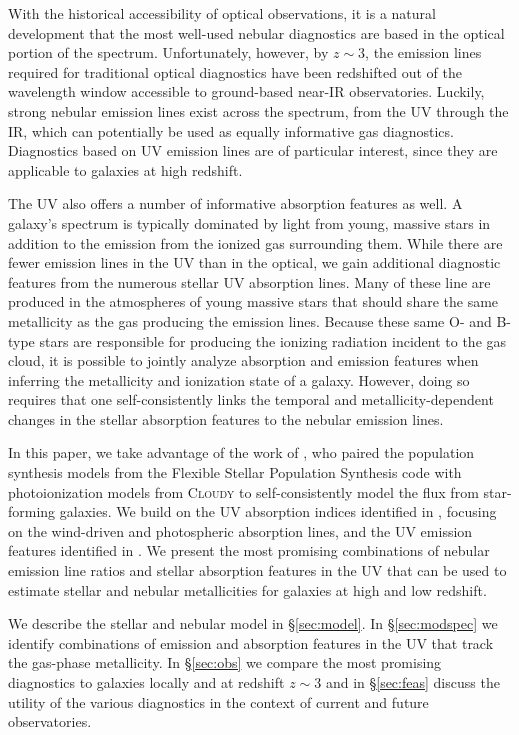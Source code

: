 \documentclass[preprint2,trackchanges]{aastex62}
\newcommand{\z}[1]{$z \sim {#1}$}
\newcommand{\FSPS}{{\sc FSPS}\xspace}
\newcommand{\Cloudy}{\textsc{Cloudy}\xspace}
\begin{document}
With the historical accessibility of optical observations, it is a natural development that the most well-used nebular diagnostics are based in the optical portion of the spectrum. Unfortunately, however, by \z{3}, the emission lines required for traditional optical diagnostics have been redshifted out of the wavelength window accessible to ground-based near-IR observatories. Luckily, strong nebular emission lines exist across the spectrum, from the UV through the IR, which can potentially be used as equally informative gas diagnostics. Diagnostics based on UV emission lines are of particular interest, since they are applicable to galaxies at high redshift.

The UV also offers a number of informative absorption features as well. A galaxy's spectrum is typically dominated by light from young, massive stars in addition to the emission from the ionized gas surrounding them. While there are fewer emission lines in the UV than in the optical, we gain additional diagnostic features from the numerous stellar UV absorption lines. Many of these line are produced in the atmospheres of young massive stars that should share the same metallicity as the gas producing the emission lines. Because these same O- and B-type stars are responsible for producing the ionizing radiation incident to the gas cloud, it is possible to jointly analyze absorption and emission features when inferring the metallicity and ionization state of a galaxy. However, doing so requires that one self-consistently links the temporal and metallicity-dependent changes in the stellar absorption features to the nebular emission lines.

In this paper, we take advantage of the work of \citet{Byler+2017}, who paired the population synthesis models from the Flexible Stellar Population Synthesis code \citep[\FSPS; ][]{Conroy+2009, Conroy+2010} with photoionization models from \Cloudy to self-consistently model the flux from star-forming galaxies. We build on the UV absorption indices identified in \citet{Leitherer+2011}, focusing on the wind-driven and photospheric absorption lines, and the UV emission features identified in \citet{Erb+2010}. We present the most promising combinations of nebular emission line ratios and stellar absorption features in the UV that can be used to estimate stellar and nebular metallicities for galaxies at high and low redshift.

We describe the stellar and nebular model in \S\ref{sec:model}. In \S\ref{sec:modspec} we identify combinations of emission and absorption features in the UV that track the gas-phase metallicity. In \S\ref{sec:obs} we compare the most promising diagnostics to galaxies locally and at redshift \z{3} and in \S\ref{sec:feas} discuss the utility of the various diagnostics in the context of current and future observatories.
\end{document}
